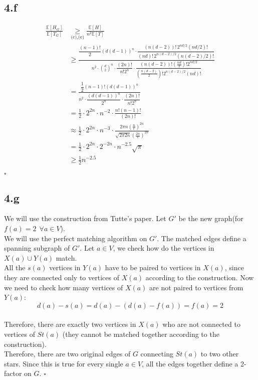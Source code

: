 \documentclass{article}
\begin{document}
\subsection*{4.f}
\begin{align*}
\frac{\mathbb{E}[H_G]}{\mathbb{E}[T_G]}
&\underset{\text{(c),(e)}}{\ge} 
\frac{\mathbb{E}[H]}{n^2 \mathbb{E}[T]} \\[2mm]
&\ge 
\frac{
\dfrac{(n-1)!}{2} (d(d-1))^n \cdot
\dfrac{(n(d-2))! \, 2^{nd/2} (nd/2)!}{(nd)! \, 2^{n(d-2)/2} (n(d-2)/2)!}
}{
n^2 \cdot \binom{d}{2}^n \cdot 
\dfrac{(2n)!}{n! 2^n} \cdot 
\dfrac{(n(d-2))! (\tfrac{nd}{2})! 2^{nd/2}}{(\tfrac{n(d-2)}{2})! 2^{n(d-2)/2} (nd)!}
} \\[2mm]
&=
\frac{
\dfrac{1}{2} (n-1)! (d(d-1))^n
}{
n^2 \cdot \dfrac{(d(d-1))^n}{2^n} \cdot \dfrac{(2n)!}{n! 2^n}
}\\[2mm]
&=\frac{1}{2}\cdot2^{2n}\cdot n^{-2}\cdot\frac{n!(n-1)!}{(2n)!
}\\[2mm]
&\approx\frac{1}{2}\cdot2^{2n}\cdot n^{-3}\cdot\frac{2\pi n(\frac{n}{e})^{2n}}{\sqrt{2\pi 2n}(\frac{2n}{e})^{2n}
}\\[2mm]
&=\frac{1}{2}\cdot2^{2n}\cdot2^{-2n}\cdot n^{-2.5}\sqrt{\pi
}\\[2mm]
&\ge\frac{1}{2} n^{-2.5}
\end{align*}

\hfill $\square$

\subsection*{4.g}
We will use the construction from Tutte's paper. Let $G'$ be the new graph(for $f(a)=2\  \ \forall a \in V$).\\
We will use the perfect matching algorithm on $G'$. The matched edges define a spanning subgraph of $G'$.
Let $a \in V$, we check how do the vertices in $X(a)\cup Y(a)$ match.\\
All the $s(a)$ vertices in $Y(a)$ have to be paired to vertices in $X(a)$, since they are connected only to vertices of $X(a)$ according to the construction. Now we need to check how many vertices of $X(a)$ are not paired to vertices from $Y(a)$:\\
\[
d(a)-s(a)=d(a)-(d(a)-f(a))=f(a)=2
\]\\
Therefore, there are exactly two vertices in $X(a)$ who are not connected to vertices of $St(a)$ (they cannot be matched together according to the construction).\\
Therefore, there are two original edges of $G$ connecting $St(a)$ to two other stars. Since this is true for every single $a \in V$, all the edges together define a 2-factor on $G$.
\hfill $\square$
\end{document}
